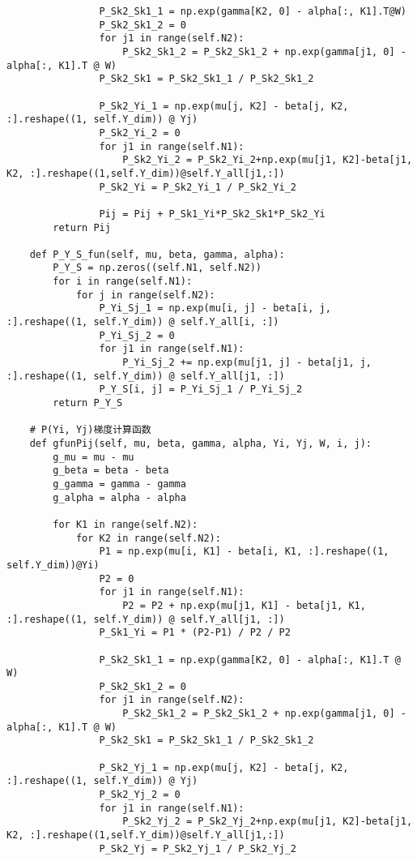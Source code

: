 \begin{lstlisting}
                P_Sk2_Sk1_1 = np.exp(gamma[K2, 0] - alpha[:, K1].T@W)
                P_Sk2_Sk1_2 = 0
                for j1 in range(self.N2):
                    P_Sk2_Sk1_2 = P_Sk2_Sk1_2 + np.exp(gamma[j1, 0] - alpha[:, K1].T @ W)
                P_Sk2_Sk1 = P_Sk2_Sk1_1 / P_Sk2_Sk1_2

                P_Sk2_Yi_1 = np.exp(mu[j, K2] - beta[j, K2, :].reshape((1, self.Y_dim)) @ Yj)
                P_Sk2_Yi_2 = 0
                for j1 in range(self.N1):
                    P_Sk2_Yi_2 = P_Sk2_Yi_2+np.exp(mu[j1, K2]-beta[j1, K2, :].reshape((1,self.Y_dim))@self.Y_all[j1,:])
                P_Sk2_Yi = P_Sk2_Yi_1 / P_Sk2_Yi_2

                Pij = Pij + P_Sk1_Yi*P_Sk2_Sk1*P_Sk2_Yi
        return Pij

    def P_Y_S_fun(self, mu, beta, gamma, alpha):
        P_Y_S = np.zeros((self.N1, self.N2))
        for i in range(self.N1):
            for j in range(self.N2):
                P_Yi_Sj_1 = np.exp(mu[i, j] - beta[i, j, :].reshape((1, self.Y_dim)) @ self.Y_all[i, :])
                P_Yi_Sj_2 = 0
                for j1 in range(self.N1):
                    P_Yi_Sj_2 += np.exp(mu[j1, j] - beta[j1, j, :].reshape((1, self.Y_dim)) @ self.Y_all[j1, :])
                P_Y_S[i, j] = P_Yi_Sj_1 / P_Yi_Sj_2
        return P_Y_S

    # P(Yi, Yj)梯度计算函数
    def gfunPij(self, mu, beta, gamma, alpha, Yi, Yj, W, i, j):
        g_mu = mu - mu
        g_beta = beta - beta
        g_gamma = gamma - gamma
        g_alpha = alpha - alpha

        for K1 in range(self.N2):
            for K2 in range(self.N2):
                P1 = np.exp(mu[i, K1] - beta[i, K1, :].reshape((1, self.Y_dim))@Yi)
                P2 = 0
                for j1 in range(self.N1):
                    P2 = P2 + np.exp(mu[j1, K1] - beta[j1, K1, :].reshape((1, self.Y_dim)) @ self.Y_all[j1, :])
                P_Sk1_Yi = P1 * (P2-P1) / P2 / P2

                P_Sk2_Sk1_1 = np.exp(gamma[K2, 0] - alpha[:, K1].T @ W)
                P_Sk2_Sk1_2 = 0
                for j1 in range(self.N2):
                    P_Sk2_Sk1_2 = P_Sk2_Sk1_2 + np.exp(gamma[j1, 0] - alpha[:, K1].T @ W)
                P_Sk2_Sk1 = P_Sk2_Sk1_1 / P_Sk2_Sk1_2

                P_Sk2_Yj_1 = np.exp(mu[j, K2] - beta[j, K2, :].reshape((1, self.Y_dim)) @ Yj)
                P_Sk2_Yj_2 = 0
                for j1 in range(self.N1):
                    P_Sk2_Yj_2 = P_Sk2_Yj_2+np.exp(mu[j1, K2]-beta[j1, K2, :].reshape((1,self.Y_dim))@self.Y_all[j1,:])
                P_Sk2_Yj = P_Sk2_Yj_1 / P_Sk2_Yj_2


\end{lstlisting}
